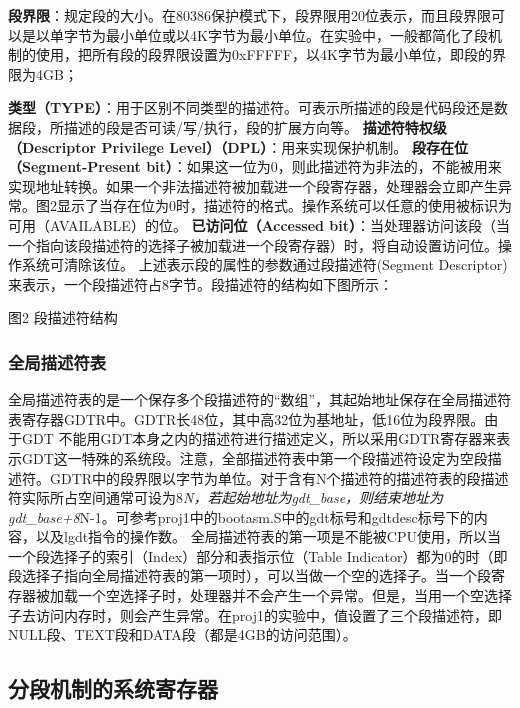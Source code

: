 \textbf{段界限}：规定段的大小。在80386保护模式下，段界限用20位表示，而且段界限可以是以单字节为最小单位或以4K字节为最小单位。在实验中，一般都简化了段机制的使用，把所有段的段界限设置为0xFFFFF，以4K字节为最小单位，即段的界限为4GB；

\textbf{类型（TYPE）}：用于区别不同类型的描述符。可表示所描述的段是代码段还是数据段，所描述的段是否可读/写/执行，段的扩展方向等。
\textbf{描述符特权级（Descriptor Privilege
Level）（DPL）}：用来实现保护机制。 \textbf{段存在位（Segment-Present
bit）}：如果这一位为0，则此描述符为非法的，不能被用来实现地址转换。如果一个非法描述符被加载进一个段寄存器，处理器会立即产生异常。图2显示了当存在位为0时，描述符的格式。操作系统可以任意的使用被标识为可用（AVAILABLE）的位。
\textbf{已访问位（Accessed
bit）}：当处理器访问该段（当一个指向该段描述符的选择子被加载进一个段寄存器）时，将自动设置访问位。操作系统可清除该位。
上述表示段的属性的参数通过段描述符(Segment
Descriptor)来表示，一个段描述符占8字节。段描述符的结构如下图所示：


图2 段描述符结构

\subsubsection{全局描述符表}\label{ux5168ux5c40ux63cfux8ff0ux7b26ux8868}

全局描述符表的是一个保存多个段描述符的``数组''，其起始地址保存在全局描述符表寄存器GDTR中。GDTR长48位，其中高32位为基地址，低16位为段界限。由于GDT
不能用GDT本身之内的描述符进行描述定义，所以采用GDTR寄存器来表示GDT这一特殊的系统段。注意，全部描述符表中第一个段描述符设定为空段描述符。GDTR中的段界限以字节为单位。对于含有N个描述符的描述符表的段描述符实际所占空间通常可设为8\emph{N，若起始地址为gdt\_base，则结束地址为gdt\_base+8}N-1。可参考proj1中的bootasm.S中的gdt标号和gdtdesc标号下的内容，以及lgdt指令的操作数。
全局描述符表的第一项是不能被CPU使用，所以当一个段选择子的索引（Index）部分和表指示位（Table
Indicator）都为0的时（即段选择子指向全局描述符表的第一项时），可以当做一个空的选择子。当一个段寄存器被加载一个空选择子时，处理器并不会产生一个异常。但是，当用一个空选择子去访问内存时，则会产生异常。在proj1的实验中，值设置了三个段描述符，即NULL段、TEXT段和DATA段（都是4GB的访问范围）。

\subsection{分段机制的系统寄存器}\label{ux5206ux6bb5ux673aux5236ux7684ux7cfbux7edfux5bc4ux5b58ux5668}

